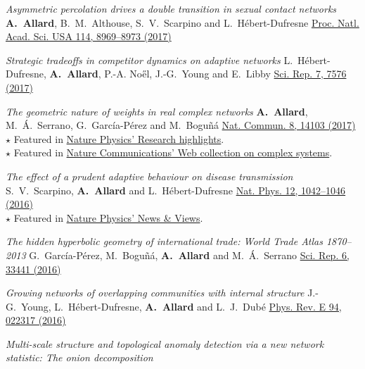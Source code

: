 \documentclass[11pt]{article}
\makeatletter
\newcommand{\reversearabic}[1]{\expandafter\@reversearabic\csname c@#1\endcsname}
\newcommand{\@reversearabic}[1]{%
  \number\numexpr\getrefnumber{this@etaremune@\romannumeral\c@etaremune}-#1+1\relax
}
\newcounter{etaremune}
\newenvironment{etaremune}[1][]{%
  \stepcounter{etaremune}%
  \begin{enumerate}[label=\reversearabic*.,#1]%
}{%
  \edef\@currentlabel{\the\csname c@\@enumctr\endcsname}%
  \label{this@etaremune@\romannumeral\c@etaremune}%
  \end{enumerate}%
}
\makeatother
\begin{document}
\begin{etaremune}[itemsep=0.5em, label={[A\reversearabic*]}]
%
  \item \parbox[t]{\textwidth-30pt}{\textit{Asymmetric percolation drives a double transition in sexual contact networks}\split
  \textbf{A.~Allard}, B.~M.~Althouse, S.~V.~Scarpino and L.~H\'ebert-Dufresne\split
  \href{https://doi.org/10.1073/pnas.1703073114}{Proc. Natl. Acad. Sci. USA 114, 8969--8973 (2017)}}
%
  \item \parbox[t]{\textwidth-30pt}{\textit{Strategic tradeoffs in competitor dynamics on adaptive networks}\split
  L.~H\'ebert-Dufresne, \textbf{A.~Allard}, P.-A. No\H{e}l, J.-G.~Young and E.~Libby\split
  \href{https://doi.org/10.1038/s41598-017-07621-x}{Sci. Rep. 7, 7576 (2017)}}
%
  \item \parbox[t]{\textwidth-30pt}{\textit{The geometric nature of weights in real complex networks}\split
  \textbf{A.~Allard}, M.~\'A.~Serrano, G.~Garc\'ia-P\'erez and M.~Bogu\~n\'a\split
  \href{http://doi.org/10.1038/ncomms14103}{Nat. Commun. 8, 14103 (2017)}\\
  {\footnotesize $\star$ Featured in \href{https://doi.org/10.1038/nphys4046}{Nature Physics' Research highlights}.}\\
  {\footnotesize $\star$ Featured in \href{https://www.nature.com/collections/ycjylwzvmz/}{Nature Communications' Web collection on complex systems}.}}
%
  \item \parbox[t]{\textwidth-30pt}{\textit{The effect of a prudent adaptive behaviour on disease transmission}\split
  S.~V.~Scarpino, \textbf{A.~Allard} and L.~H\'ebert-Dufresne\split
  \href{https://doi.org/10.1038/nphys3832}{Nat. Phys. 12, 1042--1046 (2016)}\\
  {\footnotesize $\star$ Featured in \href{https://doi.org/10.1038/nphys3939}{Nature Physics' News \& Views}.}}%
%
  \item \parbox[t]{\textwidth-30pt}{\textit{The hidden hyperbolic geometry of international trade: World Trade Atlas 1870--2013}\split
  G.~Garc\'ia-P\'erez, M.~Bogu\~n\'a, \textbf{A.~Allard} and M.~\'A.~Serrano\split
  \href{https://doi.org/10.1038/srep33441}{Sci. Rep. 6, 33441 (2016)}}
%
  \item \parbox[t]{\textwidth-30pt}{\textit{Growing networks of overlapping communities with internal structure}\split
  J.-G.~Young, L.~H\'ebert-Dufresne, \textbf{A.~Allard} and L.~J.~Dub\'e\split
  \href{https://doi.org/10.1103/PhysRevE.94.022317}{Phys. Rev. E 94, 022317 (2016)}}
%
  \item \parbox[t]{\textwidth-30pt}{\textit{Multi-scale structure and topological anomaly detection via a new network statistic: The onion decomposition}\split
}
\end{etaremune}
\end{document}
